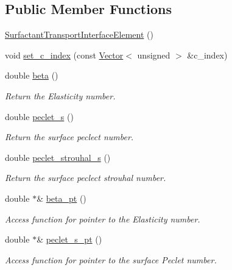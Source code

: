 \subsection*{Public Member Functions}
\begin{DoxyCompactItemize}
\item 
\hyperlink{classoomph_1_1SurfactantTransportInterfaceElement_a8934ab8e723427ed39298c592b2876a5}{Surfactant\+Transport\+Interface\+Element} ()
\item 
void \hyperlink{classoomph_1_1SurfactantTransportInterfaceElement_aaf7988dfac3e02018c591f2f9e34f644}{set\+\_\+c\+\_\+index} (const \hyperlink{classoomph_1_1Vector}{Vector}$<$ unsigned $>$ \&c\+\_\+index)
\item 
double \hyperlink{classoomph_1_1SurfactantTransportInterfaceElement_a79003d87401ad6106b8d10373ff12e73}{beta} ()
\begin{DoxyCompactList}\small\item\em Return the Elasticity number. \end{DoxyCompactList}\item 
double \hyperlink{classoomph_1_1SurfactantTransportInterfaceElement_ac945c28401b92a061e3e245e83541c55}{peclet\+\_\+s} ()
\begin{DoxyCompactList}\small\item\em Return the surface peclect number. \end{DoxyCompactList}\item 
double \hyperlink{classoomph_1_1SurfactantTransportInterfaceElement_acb4ff16ed90e79ffe9e4156ef030d689}{peclet\+\_\+strouhal\+\_\+s} ()
\begin{DoxyCompactList}\small\item\em Return the surface peclect strouhal number. \end{DoxyCompactList}\item 
double $\ast$\& \hyperlink{classoomph_1_1SurfactantTransportInterfaceElement_a7f64f64c3b5ad3abe6e09bb10a039298}{beta\+\_\+pt} ()
\begin{DoxyCompactList}\small\item\em Access function for pointer to the Elasticity number. \end{DoxyCompactList}\item 
double $\ast$\& \hyperlink{classoomph_1_1SurfactantTransportInterfaceElement_a3ce30a3705a18034585c80d2f9757099}{peclet\+\_\+s\+\_\+pt} ()
\begin{DoxyCompactList}\small\item\em Access function for pointer to the surface Peclet number. \end{DoxyCompactList}\item 

\end{DoxyCompactItemize}
